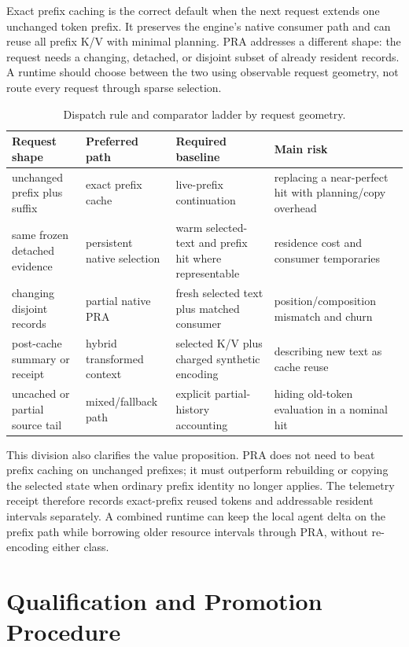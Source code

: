 \documentclass[11pt]{article}
\begin{document}
Exact prefix caching is the correct default when the next request extends one
unchanged token prefix.  It preserves the engine's native consumer path and can
reuse all prefix K/V with minimal planning.  PRA addresses a different shape:
the request needs a changing, detached, or disjoint subset of already resident
records.  A runtime should choose between the two using observable request
geometry, not route every request through sparse selection.

\begin{table}[H]
\centering
\small
\setlength{\tabcolsep}{4pt}
\begin{tabularx}{\linewidth}{p{.22\linewidth}p{.22\linewidth}p{.22\linewidth}Y}
\toprule
Request shape & Preferred path & Required baseline & Main risk \\
\midrule
unchanged prefix plus suffix & exact prefix cache & live-prefix continuation & replacing a near-perfect hit with planning/copy overhead \\
same frozen detached evidence & persistent native selection & warm selected-text and prefix hit where representable & residence cost and consumer temporaries \\
changing disjoint records & partial native PRA & fresh selected text plus matched consumer & position/composition mismatch and churn \\
post-cache summary or receipt & hybrid transformed context & selected K/V plus charged synthetic encoding & describing new text as cache reuse \\
uncached or partial source tail & mixed/fallback path & explicit partial-history accounting & hiding old-token evaluation in a nominal hit \\
\bottomrule
\end{tabularx}
\caption{Dispatch rule and comparator ladder by request geometry.}
\label{tab:prefix-pra-dispatch}
\end{table}

This division also clarifies the value proposition.  PRA does not need to beat
prefix caching on unchanged prefixes; it must outperform rebuilding or copying
the selected state when ordinary prefix identity no longer applies.  The
telemetry receipt therefore records exact-prefix reused tokens and addressable
resident intervals separately.  A combined runtime can keep the local agent
delta on the prefix path while borrowing older resource intervals through PRA,
without re-encoding either class.

\section{Qualification and Promotion Procedure}
\end{document}
